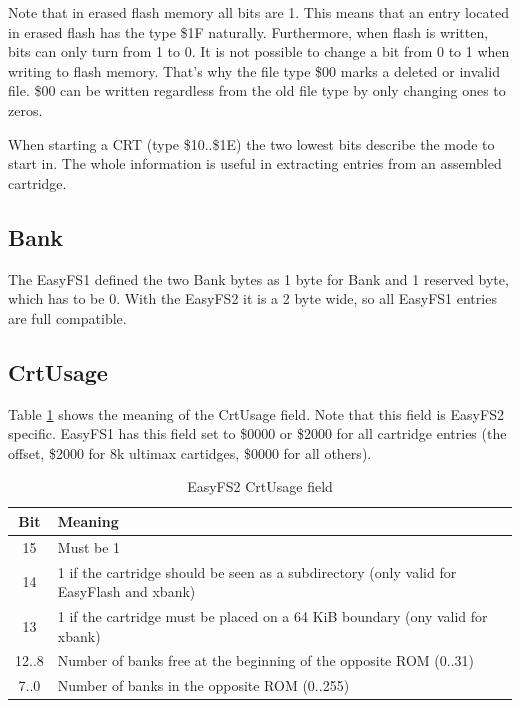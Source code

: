 \documentclass[a4paper,oneside]{memoir}
\begin{document}
Note that in erased flash memory all bits are 1. This means that an entry
located in erased flash has the type \$1F naturally. Furthermore, when flash is
written, bits can only turn from 1 to 0. It is not possible to change a bit
from 0 to 1 when writing to flash memory. That's why the file type \$00 marks a
deleted or invalid file. \$00 can be written regardless from the old file type
by only changing ones to zeros.

When starting a CRT (type \$10..\$1E) the two lowest bits describe the
mode to start in. The whole information is useful in extracting entries
from an assembled cartridge.


\subsection{Bank}

The EasyFS1 defined the two Bank bytes as 1 byte for Bank and 1 reserved byte, which has to be 0.
With the EasyFS2 it is a 2 byte wide, so all EasyFS1 entries are full compatible.


\subsection{CrtUsage}

Table \ref{tab:easyfs-crtusage} shows the meaning of the CrtUsage field.
Note that this field is EasyFS2 specific. EasyFS1 has this field set to \$0000 or \$2000
for all cartridge entries (the offset, \$2000 for 8k ultimax cartidges, \$0000 for all others).

\begin{table}[!htbp]
    \centering
    \begin{tabularx}{\textwidth}{ cX }
        \toprule
        Bit & Meaning \\
        \midrule
        15      & Must be 1 \\[3pt]
        14      & 1 if the cartridge should be seen as a subdirectory
                  (only valid for EasyFlash and xbank) \\[3pt]
        13      & 1 if the cartridge must be placed on a 64 KiB boundary
                  (ony valid for xbank) \\[3pt]
        12..8   & Number of banks free at the beginning of the opposite ROM
                  (0..31) \\[3pt]
        7..0    & Number of banks in the opposite ROM
                  (0..255) \\[3pt]
        \bottomrule
    \end{tabularx}
    \caption{EasyFS2 CrtUsage field}
    \label{tab:easyfs-crtusage}
\end{table}
\end{document}
